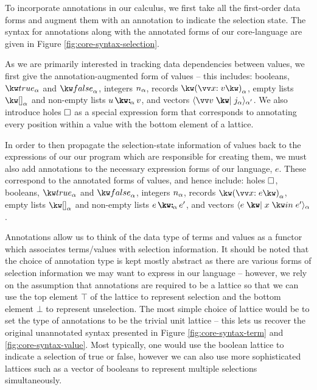 

\noindent
To incorporate annotations in our calculus, we first take all the first-order data forms and augment them with an annotation to indicate the selection state. The syntax for annotations along with the annotated forms of our core-language are given in Figure \ref{fig:core-syntax-selection}. 

As we are primarily interested in tracking data dependencies between values, we first give the annotation-augmented form of values -- this includes: booleans, $\annTrue{\alpha}$ and $\annFalse{\alpha}$, integers $n_{\alpha}$, records $\annRec{\vec{\bind{x}{v}}}{\alpha}$, empty lists $\annNil{\alpha}$ and non-empty lists $\annCons{u}{v}{\alpha}$, and vectors $\annVecVal{\vec{v}}{\annInt{j}{\alpha}}{\smash{\alpha'}}$. We also introduce holes $\square$ as a special expression form that corresponds to annotating every position within a value with the bottom element of a lattice.

In order to then propagate the selection-state information of values back to the expressions of our our program which are responsible for creating them, we must also add annotations to the necessary expression forms of our language, $e$. These correspond to the annotated forms of values, and hence include: holes $\square$, booleans, $\annTrue{\alpha}$ and $\annFalse{\alpha}$, integers $n_{\alpha}$, records $\annRec{\vec{\bind{x}{e}}}{\alpha}$, empty lists $\annNil{\alpha}$ and non-empty lists $\annCons{e}{e'}{\alpha}$, and vectors $\annVec{e}{x}{e'}{\alpha}$.

Annotations allow us to think of the data type of terms and values as a functor which associates terms/values with selection information. It should be noted that the choice of annotation type is kept mostly abstract as there are various forms of selection information we may want to express in our language -- however, we rely on the assumption that annotations are required to be a lattice so that we can use the top element $\top$ of the lattice to represent selection and the bottom element $\bot$ to represent unselection. The most simple choice of lattice would be to set the type of annotations to be the trivial unit lattice -- this lets us recover the original unannotated syntax presented in Figure \ref{fig:core-syntax-term} and \ref{fig:core-syntax-value}. Most typically, one would use the boolean lattice to indicate a selection of true or false, however we can also use more sophisticated lattices such as a vector of booleans to represent multiple selections simultaneously.



